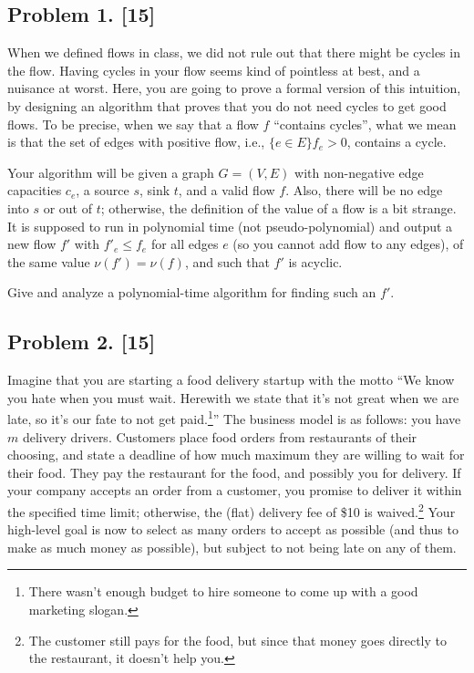 \documentclass[10pt]{article}
\begin{document}
\newpage

\subsection*{Problem 1. [15]}
When we defined flows in class, we did not rule out that there might be cycles in the flow. Having cycles in your flow seems kind of pointless at best, and a nuisance at worst. Here, you are going to prove a formal version of this intuition, by designing an algorithm that proves that you do not need cycles to get good flows. To be precise, when we say that a flow $f$ ``contains cycles'', what we mean is that the set of edges with positive flow, i.e., $\{e \in E\}{f_e > 0}$, contains a cycle.

Your algorithm will be given a graph $G=(V,E)$ with non-negative edge capacities $c_e$, a source $s$, sink $t$, and a valid flow $f$.
Also, there will be no edge into $s$ or out of $t$; otherwise, the definition of the value of a flow is a bit strange.
It is supposed to run in polynomial time (not pseudo-polynomial) and output a new flow $f'$ with $f'_e \leq f_e$ for all edges $e$ (so you cannot add flow to any edges), of the same value $\nu(f') = \nu(f)$, and such that $f'$ is acyclic.

Give and analyze a polynomial-time algorithm for finding such an $f'$.


\subsection*{Problem 2. [15]}
Imagine that you are starting a food delivery startup with the motto ``We know you hate when you must wait. Herewith we state that it's not great when we are late, so it's our fate to not get paid.\footnote{There wasn't enough budget to hire someone to come up with a good marketing slogan.}''
The business model is as follows: you have $m$ delivery drivers. Customers place food orders from restaurants of their choosing, and state a deadline of how much maximum they are willing to wait for their food. They pay the restaurant for the food, and possibly you for delivery. If your company accepts an order from a customer, you promise to deliver it within the specified time limit; otherwise, the (flat) delivery fee of \$10 is waived.\footnote{The customer still pays for the food, but since that money goes directly to the restaurant, it doesn't help you.} Your high-level goal is now to select as many orders to accept as possible (and thus to make as much money as possible), but subject to not being late on any of them.
\end{document}
